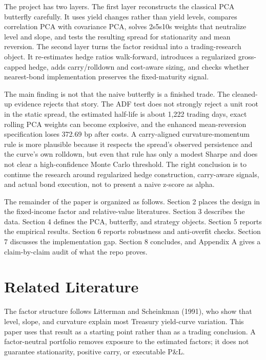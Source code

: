 \documentclass[12pt]{article}
\begin{document}
The project has two layers. The first layer reconstructs the classical PCA butterfly carefully. It
uses yield changes rather than yield levels, compares correlation PCA with covariance PCA, solves
2s5s10s weights that neutralize level and slope, and tests the resulting spread for stationarity and
mean reversion. The second layer turns the factor residual into a trading-research object. It
re-estimates hedge ratios walk-forward, introduces a regularized gross-capped hedge, adds
carry/rolldown and cost-aware sizing, and checks whether nearest-bond implementation preserves
the fixed-maturity signal.

The main finding is not that the naive butterfly is a finished trade. The cleaned-up evidence
rejects that story. The ADF test does not strongly reject a unit root in the static spread, the
estimated half-life is about 1,222 trading days, exact rolling PCA weights can become explosive,
and the enhanced mean-reversion specification loses 372.69 bp after costs. A carry-aligned
curvature-momentum rule is more plausible because it respects the spread's observed persistence
and the curve's own rolldown, but even that rule has only a modest Sharpe and does not clear a
high-confidence Monte Carlo threshold. The right conclusion is to continue the research around
regularized hedge construction, carry-aware signals, and actual bond execution, not to present a
naive z-score as alpha.

The remainder of the paper is organized as follows. Section 2 places the design in the fixed-income
factor and relative-value literatures. Section 3 describes the data. Section 4 defines the PCA,
butterfly, and strategy objects. Section 5 reports the empirical results. Section 6 reports
robustness and anti-overfit checks. Section 7 discusses the implementation gap. Section 8
concludes, and Appendix A gives a claim-by-claim audit of what the repo proves.

\section{Related Literature}

The factor structure follows Litterman and Scheinkman (1991), who show that level, slope, and
curvature explain most Treasury yield-curve variation. This paper uses that result as a starting
point rather than as a trading conclusion. A factor-neutral portfolio removes exposure to the
estimated factors; it does not guarantee stationarity, positive carry, or executable P\&L.
\end{document}
